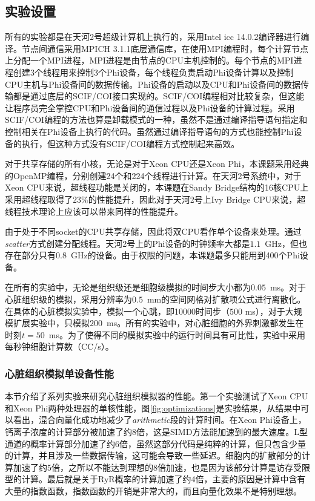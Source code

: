 \subsection{实验设置}
所有的实验都是在天河2号超级计算机上执行的，采用Intel icc 14.0.2编译器进行编译。节点间通信采用MPICH 3.1.1底层通信库，在使用MPI编程时，每个计算节点上分配一个MPI进程，MPI进程是由节点的CPU主机控制的。每个节点的MPI进程创建3个线程用来控制3个Phi设备，每个线程负责启动Phi设备计算以及控制CPU主机与Phi设备间的数据传输。Phi设备的启动以及CPU和Phi设备间的数据传输都是通过底层的SCIF/COI接口实现的。SCIF/COI编程相对比较复杂，但这能让程序员完全掌控CPU和Phi设备间的通信过程以及Phi设备的计算过程。采用SCIF/COI编程的方法也算是卸载模式的一种，虽然不是通过编译指导语句指定和控制相关在Phi设备上执行的代码。虽然通过编译指导语句的方式也能控制Phi设备的执行，但这种方式没有SCIF/COI编程方式控制起来高效。

对于共享存储的所有小核，无论是对于Xeon CPU还是Xeon Phi，本课题采用经典的OpenMP编程，分别创建24个和224个线程进行计算。在天河2号系统中，对于Xeon CPU来说，超线程功能是关闭的，本课题在Sandy Bridge结构的16核CPU上采用超线程取得了$23\%$的性能提升，因此对于天河2号上Ivy Bridge CPU来说，超线程技术理论上应该可以带来同样的性能提升。

由于处于不同socket的CPU共享存储，因此将双CPU看作单个设备来处理。通过\textit{scatter}方式创建分配线程。天河2号上的Phi设备的时钟频率大都是$1.1$~GHz，但也存在部分只有$0.8$~GHz的设备。由于权限的问题，本课题最多只能用到400个Phi设备。

在所有的实验中，无论是组织级还是细胞级模拟的时间步大小都为$0.05$~ms。对于心脏组织级的模拟，采用分辨率为$0.5$~mm的空间网格对扩散项公式进行离散化。在具体的心脏模拟实验中，模拟一个心跳，即10000时间步（$500$ ms），对于大规模扩展实验中，只模拟$200$~ms。所有的实验中，对心脏细胞的外界刺激都发生在时刻$t=50$~ms。为了使得不同的模拟实验中的运行时间具有可比性，实验中采用每秒钟细胞计算数（CC/s）。

\subsubsection{心脏组织模拟单设备性能}
本节介绍了系列实验来研究心脏组织模拟器的性能。第一个实验测试了Xeon CPU和Xeon Phi两种处理器的单核性能，图\ref{fig:optimizations}是实验结果，从结果中可以看出，混合向量化成功地减少了\textit{arithmetic}段的计算时间。在Xeon Phi设备上，钙离子浓度的计算部分被加速了约8倍，这是SIMD方法能加速到的最大速度。L型通道的概率计算部分加速了约6倍，虽然这部分代码是纯粹的计算，但只包含少量的计算，并且涉及一些数据传输，这可能会导致一些延迟。细胞内的扩散部分的计算加速了约5倍，之所以不能达到理想的8倍加速，也是因为该部分计算是访存受限型的计算。最后就是关于RyR概率的计算加速了约4倍，主要的原因是计算中含有大量的指数函数，指数函数的开销是非常大的，而且向量化效果不是特别理想。

